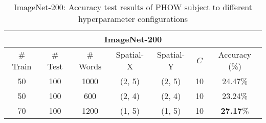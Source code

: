 \documentclass[10pt,twocolumn,letterpaper]{article}
\begin{document}
\begin{table*}
	\centering
	\begin{tabular}{|c|c|c|c|c|c|c|}
		\hline
		\multicolumn{7}{|c|}{ImageNet-200} \\
		\hline
		\# Train & \# Test & \# Words & Spatial-X & Spatial-Y & $C$ & Accuracy (\%) \\
		\hline
		50 & 100 & 1000 & (2, 5) & (2, 5) & 10 & 24.47\% \\
		\hline
		50 & 100 & 600 & (2, 4) & (2, 4) & 10 & 23.24\% \\
		\hline
		70 & 100 & 1200 & (1, 5) & (1, 5) & 10 & \textbf{27.17}\% \\
		\hline
	\end{tabular}
	\caption{ImageNet-200: Accuracy test results of PHOW subject to different hyperparameter configurations}
	\label{Tab:ImageNet}
\end{table*}
\end{document}
